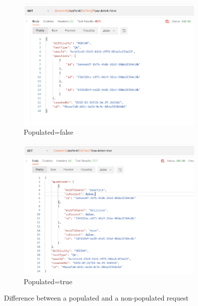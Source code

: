             \begin{figure}[H]
                \centering
                \begin{subfigure}[T]{0.49\textwidth}
                    \centering
                    \includegraphics[width=\textwidth]{assets/populated_false.png}
                    \caption{Populated=false}
                    \label{fig:impl_populated_false}
                \end{subfigure}
                \hfill
                \begin{subfigure}[T]{0.49\textwidth}
                    \centering
                    \includegraphics[width=\textwidth]{assets/populated_true.png}
                    \caption{Populated=true}
                    \label{fig:impl_populated_true}
                \end{subfigure}
                \caption{Difference between a populated and a non-populated request}
                \label{fig:impl_populated}
            \end{figure}

